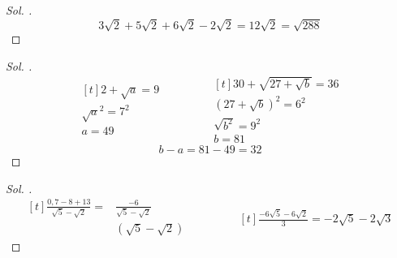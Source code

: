 \documentclass{article}
\theoremstyle{mytheoremstyle}
\theoremstyle{mytheoremstyle}
\theoremstyle{myproblemstyle}
\begin{document}
\begin{proof}[\textit{ Sol. }]
  $$ 3\sqrt{2} + 5\sqrt{2} + 6\sqrt{2} - 2\sqrt{2} = 12\sqrt{2} = \sqrt{288} $$
\end{proof}

\begin{problem}[$ \sqrt{2 + \sqrt{a}} = 3 $, $ \sqrt{30 + \sqrt{27 + \sqrt{b}}} = 6 $ ise $ b - a = ? $]
\end{problem}

\begin{proof}[\textit{ Sol. }]
  \begin{equation*}
    \begin{aligned}[t]
      2 + \sqrt{a} = 9\\
      \sqrt{a}^2 = 7^2\\
      a = 49
    \end{aligned}
    \qquad\qquad
    \begin{aligned}[t]
      30 + \sqrt{27 + \sqrt{b}} = 36\\
      (27 + \sqrt{b})^2 = 6^2\\
      \sqrt{b^2} = 9^2\\
      b = 81
    \end{aligned}
  \end{equation*}
  $$ b - a = 81 - 49 = 32 $$
\end{proof}

\begin{problem}[$ \frac{\sqrt{0,49} - \sqrt{64} + \sqrt{1,69}}{\sqrt{5} - \sqrt{2}} = ? $]
\end{problem}

\begin{proof}[\textit{ Sol. }]
  \begin{equation*}
    \begin{aligned}[t]
      \frac{0,7 - 8 + 13}{\sqrt{5} - \sqrt{2}} = &\frac{-6}{\sqrt{5} - \sqrt{2}}\\
      &(\sqrt{5} - \sqrt{2})
    \end{aligned}
    \qquad\qquad
    \begin{aligned}[t]
      \frac{-6\sqrt{5} - 6\sqrt{2}}{3} = -2\sqrt{5} - 2\sqrt{3}
    \end{aligned}
  \end{equation*}
\end{proof}

\begin{problem}[$ \frac{3 + \sqrt{3}}{3 - \sqrt{3}} + \frac{3 - \sqrt{3}}{3 + \sqrt{3}} = ? $]
\end{problem}
\end{document}
